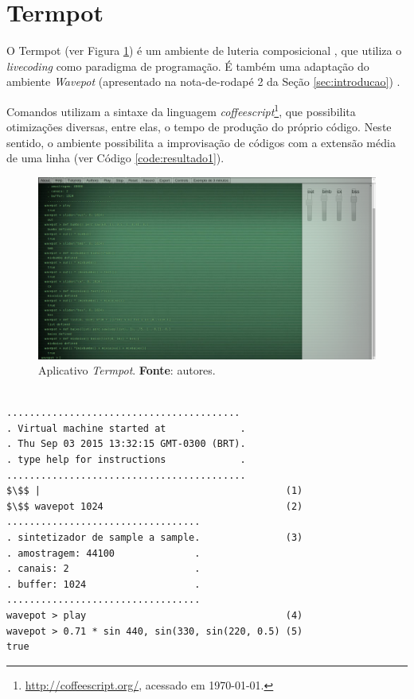 \section{Termpot}\label{sec:termpot}

O Termpot (ver Figura \ref{fig:termpot}) é um ambiente de luteria composicional \cite{iazzetta_musica_2009,soares_luteria_2015}, que utiliza o \emph{livecoding} como paradigma de programação. É também uma adaptação do ambiente \emph{Wavepot} (apresentado na nota-de-rodapé 2 da Seção \ref{sec:introducao}) . 

Comandos utilizam a sintaxe da linguagem \emph{coffeescript}\cite{burnham2011coffeescript}\footnote{\url{http://coffeescript.org/}, acessado em \today.}, que possibilita otimizações diversas, entre elas, o tempo de produção do próprio código. Neste sentido, o ambiente possibilita a improvisação de códigos com a extensão média de uma linha (ver Código \ref{code:resultado1}). 

\begin{figure}[!h]
\centering
\includegraphics[scale=0.35]{termpot.png}
\caption{Aplicativo \emph{Termpot}. \textbf{Fonte}: autores.}
\label{fig:termpot}
\end{figure}

\begin{listing}
\begin{verbatim}

.........................................
. Virtual machine started at             .
. Thu Sep 03 2015 13:32:15 GMT-0300 (BRT).
. type help for instructions             .
..........................................
$\$$ |                                           (1)
$\$$ wavepot 1024                                (2)
..................................
. sintetizador de sample a sample.               (3) 
. amostragem: 44100              .
. canais: 2                      .
. buffer: 1024                   .
..................................
wavepot > play                                   (4)
wavepot > 0.71 * sin 440, sin(330, sin(220, 0.5) (5)
true
\end{verbatim}
\caption{Console do \emph{termpot} aguardando dados de entrada do improvisador (1). O improvisador inicia o ambiente wavepot com um buffer de 1024 pontos flutuantes (2). Informações diversas do sistema de áudio (3). O improvisador inicia o processamento de áudio (4). O improvisador define o processamento de áudio (5).}
\label{code:resultado1}
\end{listing}

